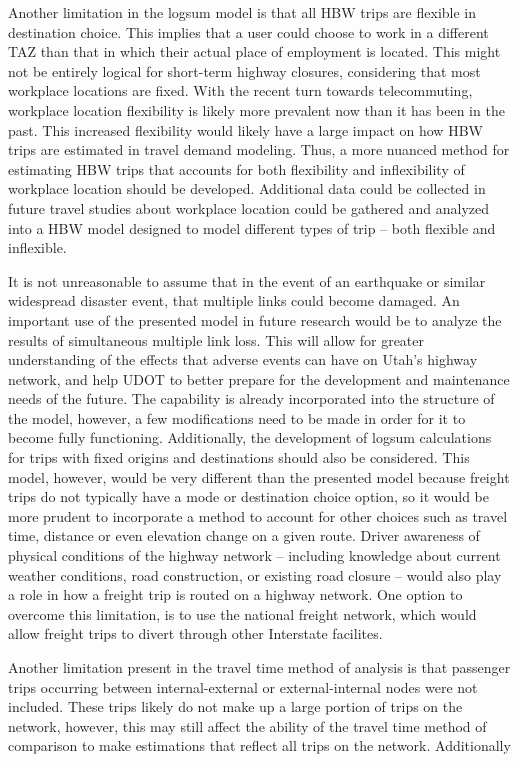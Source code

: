 Another limitation in the logsum model is that all HBW trips are flexible in
destination choice. This implies that a user could choose to work in a different
TAZ than that in which their actual place of employment is located.
This might not be entirely logical for short-term highway closures, considering that
most workplace locations are fixed. With the recent turn towards telecommuting,
workplace location flexibility is likely more prevalent now than it has been in
the past. This increased flexibility would likely have a large impact on how HBW
trips are estimated in travel demand modeling. Thus, a more nuanced method for estimating
HBW trips that accounts
for both flexibility and inflexibility of workplace location should be developed.
Additional data could be collected in future travel
studies about workplace location could be gathered
and analyzed into a HBW model designed to model different types of trip -- both flexible and inflexible.

It is not unreasonable to assume that in the event of an earthquake or
similar widespread disaster event, that multiple links could become
damaged. An important use of the presented model in future research would be
to analyze the results of simultaneous multiple link
loss. This will allow for
greater understanding of the effects that adverse events can have on Utah’s
highway network, and help UDOT to better prepare for the development and
maintenance needs of the future. The capability
is already incorporated into the structure of the model, however, a few modifications
need to be made in order for it to become fully functioning.
Additionally, the development of logsum calculations for trips with fixed
origins and destinations should also be considered. This model, however,
would be very different than the presented model because freight trips
do not typically have a mode or destination choice option, so it would be
more prudent to incorporate a method to account for other choices such as travel time,
distance or even elevation change on a given route. Driver awareness of physical
conditions of the highway network -- including knowledge about current weather conditions,
road construction, or existing road closure -- would also play a role in how a freight trip
is routed on a highway network. One option to overcome this limitation, is to use the national
freight network, which would allow freight trips to divert through other Interstate
facilites.

Another limitation present in the travel time method of analysis is that passenger
trips occurring between internal-external or external-internal nodes were not
included. These trips likely do not make up a large portion of trips on the network,
however, this may still affect the ability of the travel time method of comparison
to make estimations that reflect all trips on the network. Additionally

